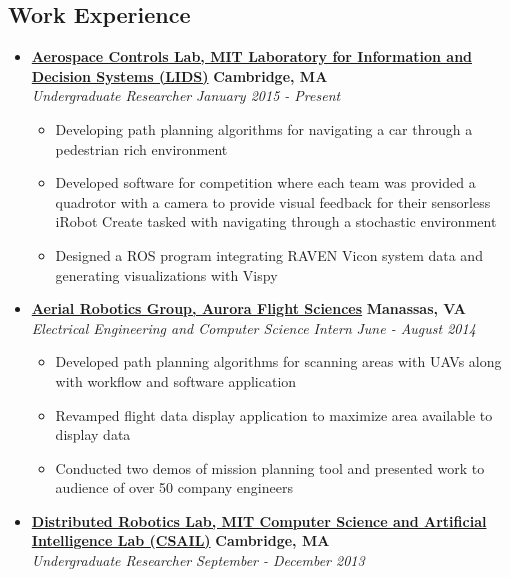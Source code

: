 \documentclass[10pt,letterpaper]{article}
\begin{document}
\subsection*{Work Experience}
  \begin{itemize}
    \parskip=-0.1em

    \item[]
    {\href{http://acl.mit.edu/}{\textbf{Aerospace Controls Lab, MIT Laboratory for Information and Decision Systems (LIDS)}} \hfill
      \textbf{Cambridge, MA}}
    \\
    {\emph{Undergraduate Researcher} \hfill \emph{January 2015 - Present}}
	
	\begin{itemize}[label=\textbullet]
	\itemsep0em 
	\item Developing path planning algorithms for navigating a car through a pedestrian rich environment
	\item Developed software for competition where each team was provided a quadrotor with a camera to provide visual feedback for their sensorless iRobot Create tasked with navigating through a stochastic environment
	\item Designed a ROS program integrating RAVEN Vicon system data and generating visualizations with Vispy
	
\end{itemize}

    \item[]
    {\href{http://aurora.aero}{\textbf{Aerial Robotics Group, Aurora Flight Sciences}} \hfill
      \textbf{Manassas, VA}}
    \\
    {\emph{Electrical Engineering and Computer Science Intern} \hfill \emph{June - August 2014}}
	
	\begin{itemize}[label=\textbullet]
	\itemsep0em
	\item Developed path planning algorithms for scanning areas with UAVs along with workflow and software application
	\item Revamped flight data display application to maximize area available to display data
	\item Conducted two demos of mission planning tool and presented work to audience of over 50 company engineers

\end{itemize}

    \item[]
    {\href{http://ppm.csail.mit.edu/}{\textbf{Distributed Robotics Lab, MIT Computer Science and Artificial Intelligence Lab (CSAIL)}} \hfill
      \textbf{Cambridge, MA}}
    \\
    {\emph{Undergraduate Researcher} \hfill \emph{September - December 2013}}
	

\end{itemize}
\end{document}
